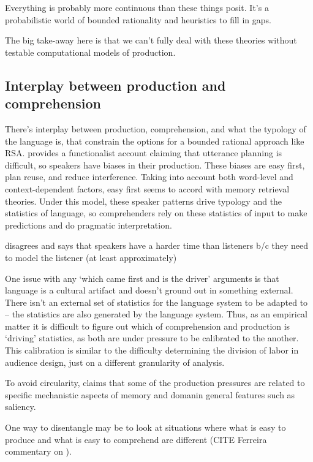 \documentclass[]{article}
\begin{document}
Everything is probably more continuous than these things posit. It's a probabilistic world of bounded rationality and heuristics to fill in gaps. 

The big take-away here is that we can't fully deal with these theories without testable computational models of production. %

\subsection{Interplay between production and comprehension}

There's interplay between production, comprehension, and what the typology of the language is, that constrain the options for a bounded rational approach like RSA. \cite{macdonald2013} provides a functionalist account claiming that utterance planning is difficult, so speakers have biases in their production. These biases are easy first, plan reuse, and reduce interference. Taking into account both word-level and context-dependent factors, easy first seems to accord with memory retrieval theories. %
Under this model, these speaker patterns drive typology and the statistics of language, so comprehenders rely on these statistics of input to make predictions and do pragmatic interpretation. 

\cite{heller2012} disagrees and says that speakers have a harder time than listeners b/c they need to model the listener (at least approximately) %

One issue with any `which came first and is the driver' arguments is that language is a cultural artifact and doesn't ground out in something external. There isn't an external set of statistics for the language system to be adapted to -- the statistics are also generated by the language system. Thus, as an empirical matter it is difficult to figure out which of comprehension and production is `driving' statistics, as both are under pressure to be calibrated to the another. This calibration is similar to the difficulty determining the division of labor in audience design, just on a different granularity of analysis. 

To avoid circularity, \cite{macdonald2013} claims that some of the production pressures are related to specific mechanistic aspects of memory and domanin general features such as saliency. %

One way to disentangle may be to look at situations where what is easy to produce and what is easy to comprehend are different (CITE Ferreira commentary on \cite{pickering2004}). 
\end{document}
